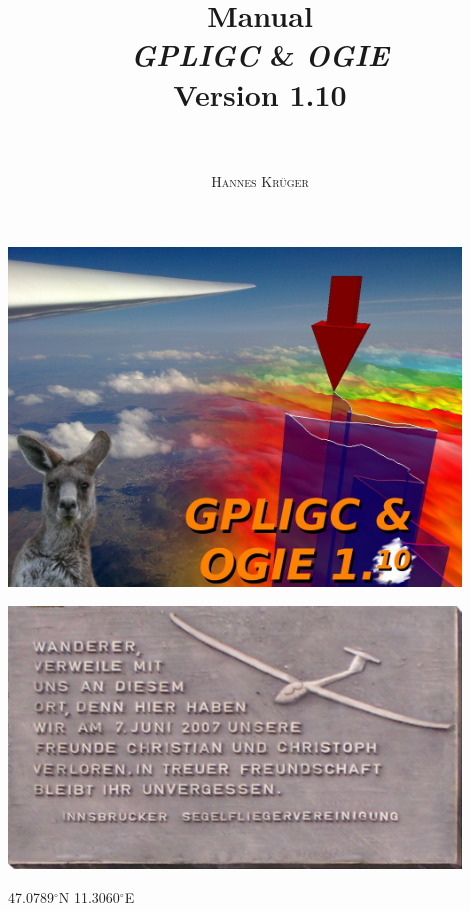 \documentclass[a4paper,10pt]{article}
\title{
{\huge \textbf{Manual}}\\
\emph{GPLIGC} \& \emph{OGIE}\\
{\small Version 1.10}\\
~\\
}
\author{\textsc{Hannes Kr\"uger}}
\begin{document}
\maketitle
\begin{center}
\includegraphics[width=12cm]{jpg/logo}
\end{center}

\newpage

\thispagestyle{empty}
\begin{center}
\includegraphics[width=12cm]{png/CC}
\end{center}
47.0789$^\circ$N 11.3060$^\circ$E

\newpage
\tableofcontents
\sloppy





%       
%       
%       






\begin{appendix}






%



\end{appendix}




\end{document}
